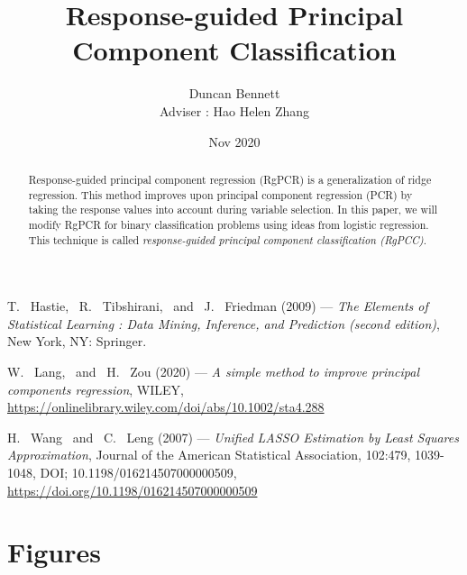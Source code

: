 \documentclass[11pt, english]{article}
\title{Response-guided Principal Component Classification}
\date {Nov 2020}
\author{Duncan Bennett \\ Adviser : Hao Helen Zhang}
\begin{document}
\def\smfbyname{}


\maketitle
\begin{abstract}
Response-guided principal component regression (RgPCR) is a generalization of ridge regression. This method improves upon principal component regression (PCR) by taking the response values into account during variable selection. In this paper, we will modify RgPCR for binary classification problems using ideas from logistic regression. This technique is called \textit{response-guided principal component classification (RgPCC)}.
\end{abstract}
\tableofcontents


 


 











\def\refname{Bibliography}
\begin{thebibliography}{99}

 {\sc T. \ Hastie, \ R. \ Tibshirani, \ and \ J. \ Friedman (2009)} ---
 {\it The Elements of Statistical Learning : Data Mining, Inference, and Prediction
 (second edition)}, New York, NY: Springer.

 {\sc W. \ Lang, \ and \ H. \ Zou (2020)} ---
 {\it A simple method to improve principal components regression},
 WILEY, \href{https://onlinelibrary.wiley.com/doi/abs/10.1002/sta4.288}{https://onlinelibrary.wiley.com/doi/abs/10.1002/sta4.288}

 {\sc H. \ Wang \ and \ C. \ Leng (2007)} ---
 {\it Unified LASSO Estimation by Least Squares Approximation},
 Journal of the American Statistical Association, 102:479, 1039-1048, DOI; 10.1198/016214507000000509, \href{https://doi.org/10.1198/016214507000000509}{https://doi.org/10.1198/016214507000000509}

\end{thebibliography}


\section{Figures}
%
\end{document}
